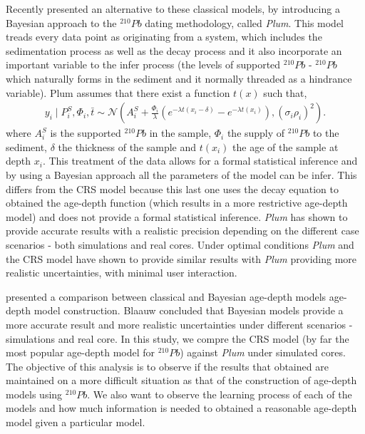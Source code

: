\documentclass [10pt] {article}
\begin{document}
Recently \citet{Aquino2018} presented an alternative to these classical models, by introducing a Bayesian approach to the $^{210}Pb$ dating methodology, called \textit{Plum}. 
This model treads every data point as originating from a system, which includes the sedimentation process as well as the decay process and it also incorporate an important variable to the infer process (the levels of supported $^{210}Pb$ - $^{210}Pb$ which naturally forms in the sediment and it normally threaded as a hindrance variable).
Plum assumes that there exist a function $t(x)$ such that,
\begin{eqnarray}
y_i\mid P^S_i, \Phi_i, \bar{t}\sim \mathcal{N} \left(A^S_i+\frac{\Phi_i}{\lambda} \left( e^{-\lambda t(x_i-\delta)} - e^{-\lambda t(x_i)} \right), (\sigma_i\rho_i)^2 \right). 
\end{eqnarray}
where $A_i^S$ is the supported $^{210}Pb$ in the sample, $\Phi_i$ the supply of $^{210}Pb$ to the sediment, $\delta$ the thickness of the sample and $t(x_i)$ the age of the sample at depth $x_i$. 
This treatment of the data allows for a formal statistical inference and by using a Bayesian approach all the parameters of the model can be infer.
This differs from the CRS model because this last one uses the decay equation to obtained the age-depth function (which results in a more restrictive age-depth model) and does not provide a formal statistical inference.
\textit{Plum} has shown to provide accurate results with a realistic precision depending on the different case scenarios \citep{Aquino2018,Aquino2020} - both simulations and real cores.
Under optimal conditions \textit{Plum} and the CRS model have shown to provide similar results \citep{Aquino2020} with \textit{Plum} providing more realistic uncertainties, with minimal user interaction. 

\citet{Blaauw2018} presented a comparison between classical and Bayesian age-depth models age-depth model construction.
Blaauw concluded that Bayesian models provide a more accurate result and more realistic uncertainties under different scenarios - simulations and real core.  
In this study, we compre the CRS model (by far the most popular age-depth model for $^{210}Pb$) against \textit{Plum} under simulated cores.
The objective of this analysis is to observe if the results that \citet{Blaauw2018} obtained are maintained on a more difficult situation as that of the construction of age-depth models using $^{210}Pb$.
We also want to observe the learning process of each of the models and how much information is needed to obtained a reasonable age-depth model given a particular model. 
\end{document}
